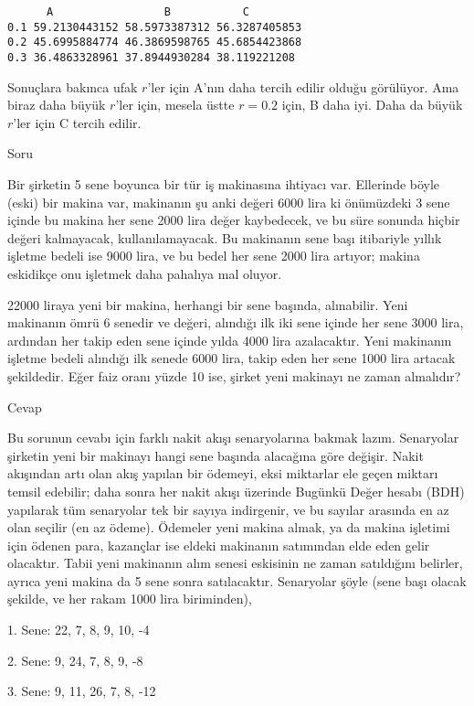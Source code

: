 \documentclass[12pt,fleqn]{article}\usepackage{../../common}
\begin{document}
\begin{verbatim}
      A                 B           C
0.1 59.2130443152 58.5973387312 56.3287405853
0.2 45.6995884774 46.3869598765 45.6854423868
0.3 36.4863328961 37.8944930284 38.119221208
\end{verbatim}

Sonuçlara bakınca ufak $r$'ler için A'nın daha tercih edilir olduğu
görülüyor. Ama biraz daha büyük $r$'ler için, mesela üstte $r=0.2$ için, B daha
iyi. Daha da büyük $r$'ler için C tercih edilir.

Soru

Bir şirketin 5 sene boyunca bir tür iş makinasına ihtiyacı var. Ellerinde böyle
(eski) bir makina var, makinanın şu anki değeri 6000 lira ki önümüzdeki 3 sene
içinde bu makina her sene 2000 lira değer kaybedecek, ve bu süre sonunda hiçbir
değeri kalmayacak, kullanılamayacak. Bu makinanın sene başı itibariyle yıllık
işletme bedeli ise 9000 lira, ve bu bedel her sene 2000 lira artıyor; makina
eskidikçe onu işletmek daha pahalıya mal oluyor.

22000 liraya yeni bir makina, herhangi bir sene başında, alınabilir. Yeni
makinanın ömrü 6 senedir ve değeri, alındığı ilk iki sene içinde her sene 3000
lira, ardından her takip eden sene içinde yılda 4000 lira azalacaktır. Yeni
makinanın işletme bedeli alındığı ilk senede 6000 lira, takip eden her sene 1000
lira artacak şekildedir. Eğer faiz oranı yüzde 10 ise, şirket yeni makinayı ne
zaman almalıdır?

Cevap

Bu sorunun cevabı için farklı nakit akışı senaryolarına bakmak lazım. Senaryolar
şirketin yeni bir makinayı hangi sene başında alacağına göre değişir. Nakit
akışından artı olan akış yapılan bir ödemeyi, eksi miktarlar ele geçen miktarı
temsil edebilir; daha sonra her nakit akışı üzerinde Bugünkü Değer hesabı (BDH)
yapılarak tüm senaryolar tek bir sayıya indirgenir, ve bu sayılar arasında en az
olan seçilir (en az ödeme). Ödemeler yeni makina almak, ya da makina işletimi
için ödenen para, kazançlar ise eldeki makinanın satımından elde eden gelir
olacaktır. Tabii yeni makinanın alım senesi eskisinin ne zaman satıldığını
belirler, ayrıca yeni makina da 5 sene sonra satılacaktır.  Senaryolar şöyle
(sene başı olacak şekilde, ve her rakam 1000 lira biriminden),

1. Sene: 22, 7, 8, 9, 10, -4

2. Sene: 9, 24, 7, 8, 9, -8

3. Sene: 9, 11, 26, 7, 8, -12
\end{document}
